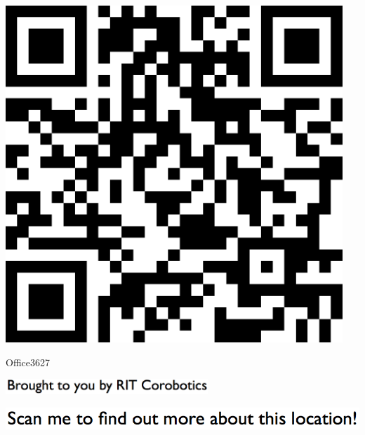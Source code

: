 \documentclass[letterpaper]{article}
\begin{document}
 \begingroup 
 \centerline{\includegraphics[scale=1,width=5in,height=5in]{Office3627.png}} 
 \endgroup 
 \vspace*{\fill} 

 \hfill{\small Office3627} 

  \vspace{0.7in} 
 
 \centerline{\includegraphics[scale=1,width=3in]{text-bottom.png}} 
 
 \pagebreak 
{} 
 \vspace*{\fill} 
 
  \centerline{\includegraphics[scale=1,width=6in]{text-top.png}} 
 
 \vspace{0.5in} 
 
\end{document}
